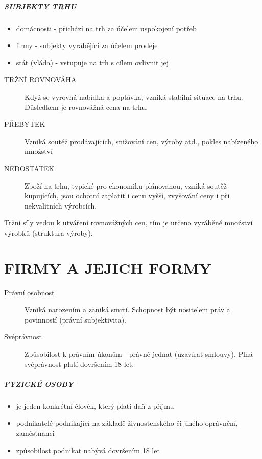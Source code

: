 \documentclass[11pt,a4paper,twoside]{book}
\begin{document}
\paragraph*{SUBJEKTY TRHU}
\begin{itemize}
	\item domácnosti - přichází na trh za účelem uspokojení potřeb
	\item firmy - subjekty vyrábějící za účelem prodeje
	\item stát (vláda) - vstupuje na trh s cílem ovlivnit jej
\end{itemize}

\begin{description}
	\item[TRŽNÍ ROVNOVÁHA] Když se vyrovná nabídka a poptávka, vzniká stabilní situace na trhu. Důsledkem je rovnovážná cena na trhu.
	\item[PŘEBYTEK] Vzniká soutěž prodávajících, snižování cen, výroby atd., pokles nabízeného množství
	\item[NEDOSTATEK] Zboží na trhu, typické pro ekonomiku plánovanou, vzniká soutěž kupujících, jsou ochotní zaplatit i cenu vyšší, zvyšování ceny i při nekvalitních výrobcích.
\end{description}

Tržní síly vedou k utváření rovnovážných cen, tím je určeno vyráběné množství výrobků (struktura výroby).

\chapter{FIRMY A JEJICH FORMY}

\begin{description}
	\item[Právní osobnost] Vzniká narozením a zaniká smrtí. Schopnost být nositelem práv a povinností (právní subjektivita).
	\item[Svéprávnost] Způsobilost k právním úkonům - právně jednat (uzavírat smlouvy). Plná svéprávnost platí dovršením 18 let.
\end{description}

\paragraph{FYZICKÉ OSOBY}

\begin{itemize}
	\item je jeden konkrétní člověk, který platí daň z příjmu
	\item podnikatelé podnikající na základě živnostenského či jiného oprávnění, zaměstnanci
	\item způsobilost podnikat nabývá dovršením 18 let
\end{itemize}
\end{document}
